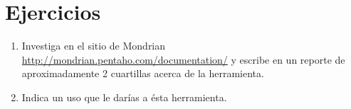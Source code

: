 \section{Ejercicios}
\begin{enumerate}
\item Investiga en el sitio de Mondrian  \url{http://mondrian.pentaho.com/documentation/} y escribe en un reporte de aproximadamente 2 cuartillas acerca de la herramienta.
\item Indica un uso que le darías a ésta herramienta.
\end{enumerate}


